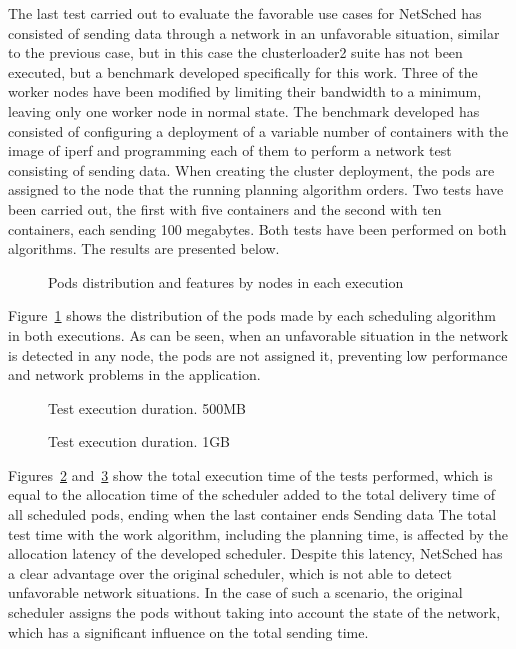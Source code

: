 \documentclass[conference]{IEEEtran}
\begin{document}
The last test carried out to evaluate the favorable use cases for NetSched has consisted of sending data through a network in an unfavorable situation, similar to the previous case, but in 
this case the clusterloader2 suite has not been executed, but a benchmark developed specifically for this work. Three of the worker nodes have been modified by limiting their bandwidth to a minimum, leaving 
only one worker node in normal state. The benchmark developed has consisted of configuring a deployment of a variable number of containers with the image of iperf and programming each of them to perform a 
network test consisting of sending data. When creating the cluster deployment, the pods are assigned to the node that the running planning algorithm orders. Two tests have been carried out, the first with 
five containers and the second with ten containers, each sending 100 megabytes. Both tests have been performed on both algorithms. The results are presented below.

\begin{figure}[h]
\begin{center}
\strut{}
\caption{Pods distribution and features by nodes in each execution}\label{fig:podsfeatures}
\end{center}
\end{figure}


Figure~\ref{fig:podsfeatures} shows the distribution of the pods made by each scheduling algorithm in both executions. As can be seen, when an unfavorable situation in the network is detected in any node, the pods are not assigned it, preventing low performance and network problems in the application.

\begin{figure}[h]
\begin{center}
\strut{}
\caption{Test execution duration. 500MB}\label{fig:test500}
\end{center}
\end{figure}

\begin{figure}[h]
\begin{center}
\strut{}
\caption{Test execution duration. 1GB}\label{fig:test1}
\end{center}
\end{figure}

Figures~\ref{fig:test500} and~\ref{fig:test1} show the total execution time of the tests performed, which is equal to the allocation time of the scheduler added to the total delivery time of all scheduled pods, ending when the last container ends Sending data The total test time with the work algorithm, including the planning time, is affected by the allocation latency of the developed scheduler. Despite this latency, NetSched has a clear advantage over the original scheduler, which is not able to detect unfavorable network situations. In the case of such a scenario, the original scheduler assigns the pods without taking into account the state of the network, which has a significant influence on the total sending time.
\end{document}
